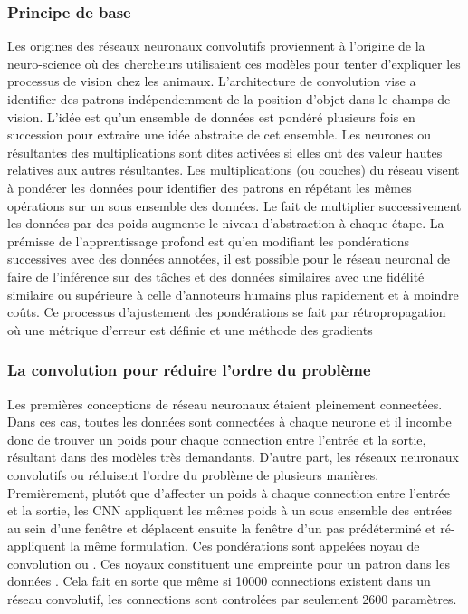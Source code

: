     \subsubsection{Principe de base}
    Les origines des réseaux neuronaux convolutifs proviennent à l'origine de la neuro-science où des chercheurs utilisaient ces modèles pour tenter d'expliquer les processus de vision \parencite{Fukushima:NeocognitronSelforganizing:1980} chez les animaux. L'architecture de convolution vise a identifier des patrons indépendemment de la position d'objet dans le champs de vision. L'idée est qu'un ensemble de données est pondéré plusieurs fois en succession pour extraire une idée abstraite de cet ensemble. Les neurones ou résultantes des multiplications sont dites activées si elles ont des valeur hautes relatives aux autres résultantes. Les multiplications (ou couches) du réseau visent à pondérer les données pour identifier des patrons en répétant les mêmes opérations sur un sous ensemble des données. Le fait de multiplier successivement les données par des poids augmente le niveau d'abstraction à chaque étape. La prémisse de l'apprentissage profond est qu'en modifiant les pondérations successives avec des données annotées, il est possible pour le réseau neuronal de faire de l'inférence sur des tâches et des données similaires avec une fidélité similaire ou supérieure à celle d'annoteurs humains plus rapidement et à moindre coûts. Ce processus d'ajustement des pondérations se fait par rétropropagation où une métrique d'erreur est définie et une méthode des gradients \parencite{Rumelhart:LearningRepresentations:1986}\par
    \subsubsection{La convolution pour réduire l'ordre du problème}
    Les premières conceptions de réseau neuronaux étaient pleinement connectées. Dans ces cas, toutes les données sont connectées à chaque neurone et il incombe donc de trouver un poids pour chaque connection entre l'entrée et la sortie, résultant dans des modèles très demandants. D'autre part,  les réseaux neuronaux convolutifs ou \fg{} réduisent l'ordre du problème de plusieurs manières. Premièrement, plutôt que d'affecter un poids à chaque connection entre l'entrée et la sortie, les \ac{CNN} appliquent les mêmes poids à un sous ensemble des entrées au sein d'une fenêtre et déplacent ensuite la fenêtre d'un pas prédéterminé et ré-appliquent la même formulation. Ces pondérations sont appelées noyau de convolution ou  \fg. Ces noyaux constituent une empreinte pour un patron dans les données \parencite{Lecun:ConvolutionalNetworks:1995}. Cela fait en sorte que même si 10000 connections existent dans un réseau convolutif, les connections sont controlées par seulement 2600 paramètres.\par
